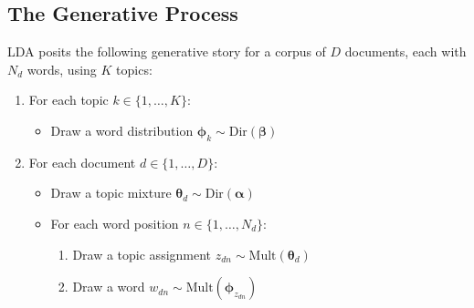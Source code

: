 \subsection{The Generative Process}

LDA posits the following generative story for a corpus of $D$ documents,
each with $N_d$ words, using $K$ topics:

\begin{enumerate}
    \item For each topic $k \in \{1, \ldots, K\}$:
    \begin{itemize}
        \item Draw a word distribution $\bm{\phi}_k \sim \text{Dir}(\bm{\beta})$
    \end{itemize}
    \item For each document $d \in \{1, \ldots, D\}$:
    \begin{itemize}
        \item Draw a topic mixture $\bm{\theta}_d \sim \text{Dir}(\bm{\alpha})$
        \item For each word position $n \in \{1, \ldots, N_d\}$:
        \begin{enumerate}
            \item Draw a topic assignment $z_{dn} \sim \text{Mult}(\bm{\theta}_d)$
            \item Draw a word $w_{dn} \sim \text{Mult}(\bm{\phi}_{z_{dn}})$
        \end{enumerate}
    \end{itemize}
\end{enumerate}

